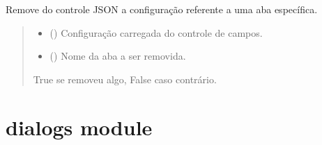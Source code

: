 \documentclass[letterpaper,10pt,english]{sphinxmanual}
\begin{document}
\begin{fulllineitems}
\label{\detokenize{api/config:config.delete_sheet_key}}
\pysigstartsignatures
\pysiglinewithargsret
{}
{\sphinxparamcomma {}}
{}
\pysigstopsignatures
\sphinxAtStartPar
Remove do controle JSON a configuração referente a uma aba específica.
\begin{quote}\begin{description}
\begin{itemize}
\item {} 
\sphinxAtStartPar
{} () \textendash{} Configuração carregada do controle de campos.

\item {} 
\sphinxAtStartPar
{} () \textendash{} Nome da aba a ser removida.

\end{itemize}

\sphinxAtStartPar
True se removeu algo, False caso contrário.

\sphinxAtStartPar
{}

\end{description}\end{quote}

\end{fulllineitems}


\sphinxstepscope


\section{dialogs module}
\label{\detokenize{api/dialogs:module-dialogs}}\label{\detokenize{api/dialogs:dialogs-module}}\label{\detokenize{api/dialogs::doc}}
\end{document}
